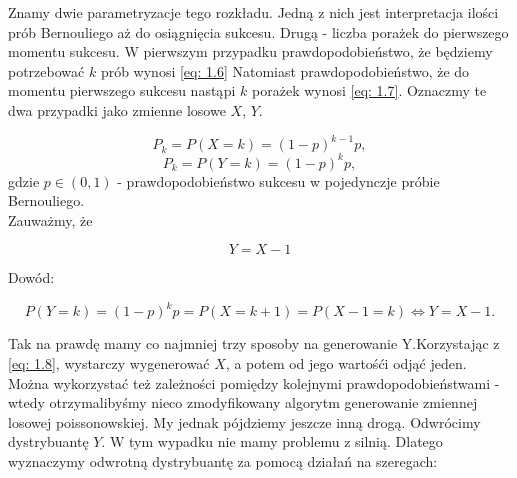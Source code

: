 \documentclass{article}
\theoremstyle{break}
\numberwithin{equation}{subsection}
\numberwithin{figure}{section}
\begin{document}
Znamy dwie parametryzacje tego rozkładu. Jedną z nich jest interpretacja ilości prób Bernouliego aż do osiągnięcia sukcesu. Drugą - liczba porażek do pierwszego momentu sukcesu. W pierwszym przypadku prawdopodobieństwo, że będziemy potrzebować $k$ prób wynosi \eqref{eq: 1.6}
Natomiast prawdopodobieństwo, że do momentu pierwszego sukcesu nastąpi $k$ porażek wynosi \eqref{eq: 1.7}. Oznaczmy te dwa przypadki jako zmienne losowe $X$, $Y$. 

\begin{equation}
P_k = P(X=k) = (1-p)^{k-1}p, \label{eq: 1.6}
\end{equation}
\begin{equation}
P_k = P(Y = k) = (1-p)^k p, \label{eq: 1.7}
\end{equation}
gdzie $p \in (0,1)$ - prawdopodobieństwo sukcesu w pojedynczje próbie Bernouliego. \\

Zauważmy, że

\begin{equation}
Y = X - 1 \label{eq: 1.8}
\end{equation}

Dowód:

$$P(Y=k) = (1-p)^k p = P(X = k+1) = P(X-1 = k) \Leftrightarrow Y=X-1.$$

Tak na prawdę mamy co najmniej trzy sposoby na generowanie Y.Korzystając z \eqref{eq: 1.8}, wystarczy wygenerować $X$, a potem od jego wartośći odjąć jeden. Można wykorzystać też zależności pomiędzy kolejnymi prawdopodobieństwami - wtedy otrzymalibyśmy nieco zmodyfikowany algorytm generowanie zmiennej losowej poissonowskiej.
My jednak pójdziemy jeszcze inną drogą. Odwrócimy dystrybuantę $Y$. W tym wypadku nie mamy problemu z silnią. Dlatego wyznaczymy odwrotną dystrybuantę za pomocą działań na szeregach:
\end{document}
